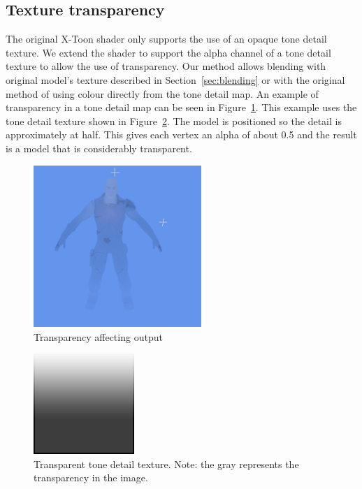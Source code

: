 \documentclass[annual]{acmsiggraph}
\begin{document}
\subsection{Texture transparency}
\label{sec:transparency}
The original X-Toon shader only supports the use of an opaque tone detail texture. We extend the shader to support the alpha channel of a tone detail texture to allow the use of transparency. Our method allows blending with original model's texture described in Section~\ref{sec:blending} or with the original method of using colour directly from the tone detail map. An example of transparency in a tone detail map can be seen in Figure~\ref{fig:transparency}. This example uses the tone detail texture shown in Figure~\ref{fig:transparent_tone}. The model is positioned so the detail is approximately at half. This gives each vertex an alpha of about 0.5 and the result is a model that is considerably transparent.

\begin{figure}[h]
	\centering
	\includegraphics[width=2.5in]{images/transparency}
	\caption{Transparency affecting output}
	\label{fig:transparency}
\end{figure}

\begin{figure}[h]
	\centering
	\includegraphics[width=1.5in]{images/xtoon_shading_alpha}
	\caption{Transparent tone detail texture. Note: the gray represents the transparency in the image.}
	\label{fig:transparent_tone}
\end{figure}
\end{document}
